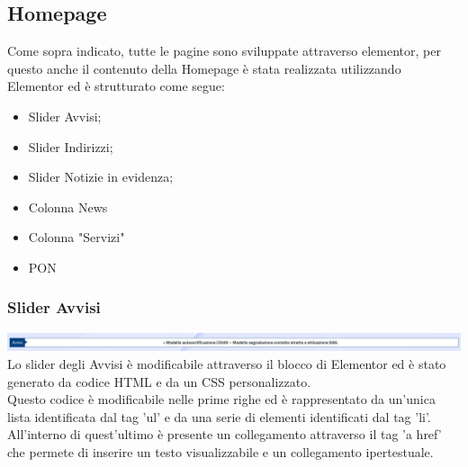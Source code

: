 \documentclass{article}
\begin{document}
	\subsection{\textbf{Homepage}}
	Come sopra indicato, tutte le pagine sono sviluppate attraverso elementor, per questo anche il contenuto della Homepage è stata realizzata utilizzando Elementor ed è strutturato come segue:
	\begin{itemize}
		\item Slider Avvisi;
		\item Slider Indirizzi;
		\item Slider Notizie in evidenza;
		\item Colonna News
		\item Colonna "Servizi"
		\item PON
	\end{itemize}	

	\subsubsection{\textbf{Slider Avvisi}}
		\includegraphics[scale=0.19]{Slider Avvisi.jpeg}\\
		Lo slider degli Avvisi è modificabile attraverso il blocco di Elementor ed è stato generato da codice HTML e da un CSS personalizzato.\\
		Questo codice è modificabile nelle prime righe ed è rappresentato da un'unica lista identificata dal tag 'ul' e da una serie di elementi identificati dal tag 'li'. All'interno di quest'ultimo è presente un collegamento attraverso il tag 'a href' che permete di inserire un testo visualizzabile e un collegamento ipertestuale.\\
	
\end{document}
